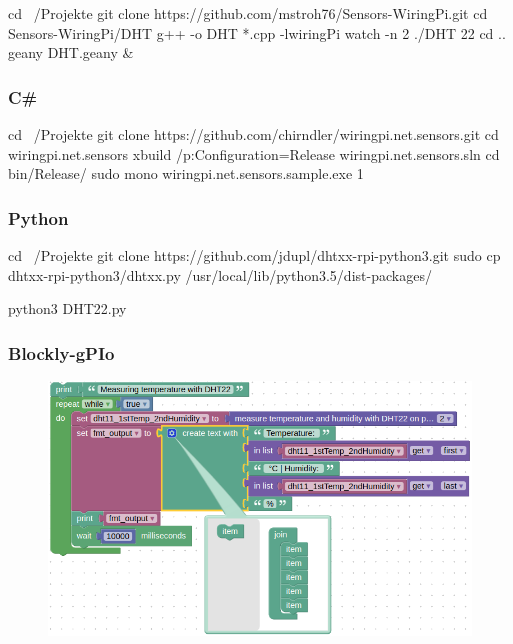 \begin{console}
	cd ~/Projekte
	git clone https://github.com/mstroh76/Sensors-WiringPi.git
	cd Sensors-WiringPi/DHT
	g++ -o DHT *.cpp -lwiringPi	
	watch -n 2 ./DHT 22
	cd ..
	geany DHT.geany &
\end{console}

\subsubsection{C\#}

\begin{console}
	cd ~/Projekte
	git clone https://github.com/chirndler/wiringpi.net.sensors.git
	cd wiringpi.net.sensors
	xbuild /p:Configuration=Release wiringpi.net.sensors.sln
	cd bin/Release/
	sudo mono wiringpi.net.sensors.sample.exe 1
\end{console}

\subsubsection{Python}
\begin{console}
	cd ~/Projekte
	git clone https://github.com/jdupl/dhtxx-rpi-python3.git
	sudo cp dhtxx-rpi-python3/dhtxx.py /usr/local/lib/python3.5/dist-packages/
\end{console}

\lstset{language=Python, caption=, 
        label=DHT22Program, frame=single, basicstyle=\ttfamily
	      \footnotesize, breakatwhitespace=false, showstringspaces=false, 
        showtabs=false, tabsize=2 }


\begin{console}
	python3 DHT22.py
\end{console}

\clearpage
\subsubsection{Blockly-gPIo}

\begin{figure}[ht]
	\includegraphics[scale=0.44]{images/Blockly-gPIo_DHT11_EN.png}
	\label{Blockly-gPIo_DHT11}
\end{figure}

